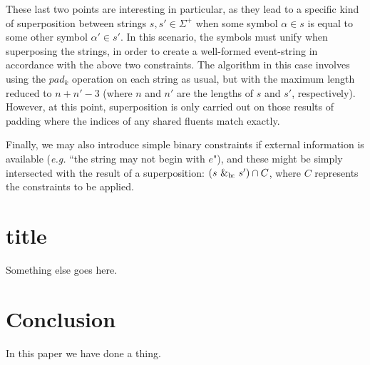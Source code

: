 \documentclass[a4paper,11pt]{article}
\newcommand{\bc}{{\rm b\!c}}
\begin{document}
These last two points are interesting in particular, as they lead to a specific 
kind of superposition between strings $s, s' \in \Sigma^+$ when some 
symbol $\alpha \in s$ is equal to some other symbol $\alpha' \in s'$. In this 
scenario, the symbols must unify when superposing the strings, in order to 
create a well-formed event-string in accordance with the above two constraints. 
The algorithm in this case involves using the $pad_k$ operation on each string 
as usual, but with the maximum length reduced to $n + n' - 3$ (where $n$ and 
$n'$ are the lengths of $s$ and $s'$, respectively). However, at this point, 
superposition is only carried out on those results of padding where the indices 
of any shared fluents match exactly.



Finally, we may also introduce simple binary constraints if external 
information is 
available (\textit{e.g.} ``the string may not begin with $e$"), and these might 
be 
simply intersected with the result of a superposition: $(s\ \&_{\bc} \ s') \cap 
C$, where $C$ represents the constraints to be applied.

\section{title}
Something else goes here.

\section{Conclusion}
In this paper we have done a thing.
{}

\end{document}
